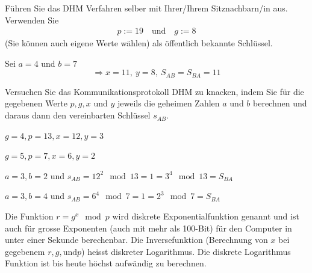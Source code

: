 \begin{myexercise}\label{ex:selberDHM}
	Führen Sie das DHM Verfahren selber mit Ihrer/Ihrem Sitznachbarn/in aus. Verwenden Sie
	\begin{align*}
		p := 19 \quad \text{und}\quad g := 8
	\end{align*}
	(Sie können auch eigene Werte wählen) als öffentlich bekannte Schlüssel.

	\begin{myanswer}
		Sei $a=4$ und $b=7$ $$\Rightarrow x=11,\ y=8,\ S_{AB}=S_{BA}=11$$
	\end{myanswer}
\end{myexercise}

\begin{myexercise}\label{ex:DHMKnacken}
	Versuchen Sie das Kommunikationsprotokoll DHM zu knacken, indem Sie
	für die gegebenen Werte $p, g, x$ und $y$ jeweils die geheimen Zahlen $a$ und $b$ berechnen und daraus
	dann den vereinbarten Schlüssel $s_{AB}$.
	\begin{aenum}
		\item $g = 4, p = 13, x = 12, y = 3$
		\item $g = 5, p = 7, x = 6, y = 2$
	\end{aenum}
	\begin{myanswer}
		\begin{aenum}
			\item $a = 3, b = 2$ und $s_{AB} = 12^{2}\mod 13 = 1 = 3^4 \mod 13 = S_{BA}$
			\item $a = 3, b = 4$ und $s_{AB} = 6^4\mod 7 = 1 = 2^3 \mod 7 = S_{BA}$
		\end{aenum}
	\end{myanswer}
\end{myexercise}

Die Funktion $r=g^x \mod p$ wird diskrete Exponentialfunktion genannt und ist auch für grosse Exponenten (auch mit mehr als 100-Bit) für den Computer in unter einer Sekunde berechenbar. Die Inversefunktion (Berechnung von $x$ bei gegebenem $r, g, \text{und} p$) heisst diskreter Logarithmus. Die diskrete Logarithmus Funktion ist bis heute höchst aufwändig zu berechnen. 

